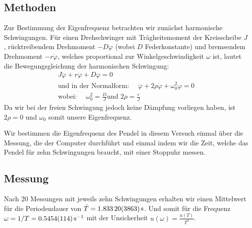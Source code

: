 \documentclass[11pt,a4paper,titlepage, ngerman]{article}
\begin{document}
		\subsection*{Methoden}
			
			Zur Bestimmung der Eigenfrequenz betrachten wir zunächst harmonische Schwingungen.					
			Für einen Drehschwinger mit Trägheitsmoment der Kreisscheibe $J$, rücktreibendem Drehmoment $-D\varphi$ (wobei $D$ Federkonstante) und bremsendem Drehmoment $-r\dot{\varphi}$, welches proportional zur Winkelgeschwindigkeit $\omega$ ist, lautet die Bewegungsgleichung der harmonischen Schwingung:
			\begin{align} 
				J\ddot{\varphi}+r\dot{\varphi}+D\varphi=0 \\
				\text{und in der Normalform: } \quad  \ddot{\varphi}+2\rho\dot{\varphi}+\omega_0^2\varphi=0 \label{eq:HarmonischeSchwingung}\\
				\text{wobei: } \quad  \omega_0^2 = \frac{D}{J} \text{und } 2\rho = \frac{r}{J}
			\end{align} 
			Da wir bei der freien Schwingung jedoch keine Dämpfung vorliegen haben, ist $2\rho = 0$ und $\omega_0$ somit unsere Eigenfrequenz.
			
			Wir bestimmen die Eigenfrequenz des Pendel in diesem Versuch einmal über die Messung, die der Computer durchführt und einmal indem wir die Zeit, welche das Pendel für zehn Schwingungen braucht, mit einer Stoppuhr messen.
		
		\subsection*{Messung}
			
			Nach 20 Messungen mit jeweils zehn Schwingungen erhalten wir einen Mittelwert für die Periodendauer von
			$\bar{T} = \SI{1,8332+-0,03863}{\second}$.		
			Und somit für die Frequenz $\omega=1/T = \SI{0,5454+-0,0114}{\per\second}$ mit der Unsicherheit $u(\omega) = \frac{u(T)}{T^2}$.
			
\end{document}
